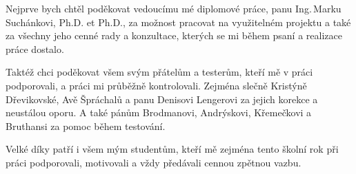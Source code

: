 \documentclass[czech,master,unicode]{ctufit-thesis}
\begin{document}
 
\frontmatter\frontmatterinit %
\thispagestyle{empty}\maketitle\thispagestyle{empty}\cleardoublepage %


\imprintpage %
\stopTOCentries

\begin{acknowledgmentpage}
    Nejprve bych chtěl poděkovat vedoucímu mé diplomové práce, panu Ing.\,Marku Suchánkovi, Ph.D. et Ph.D., za možnost pracovat na využitelném projektu a také za všechny jeho cenné rady a konzultace, kterých se mi během psaní a realizace práce dostalo.

    \vspace{1em}
    
    Taktéž chci poděkovat všem svým přátelům a testerům, kteří mě v práci podporovali, a práci mi průběžně kontrolovali. Zejména slečně Kristýně Dřevikovské, Avě Špráchalů a panu Denisovi Lengerovi za jejich korekce a neustálou oporu. A také pánům
    Brodmanovi,
    Andrýskovi,
    Křemečkovi
    a
    Bruthansi 
    za pomoc během testování.

    \vspace{1em}

    Velké díky patří i všem mým studentům, kteří mě zejména tento školní rok při práci podporovali, motivovali a vždy předávali cennou zpětnou vazbu. 
\end{acknowledgmentpage} 
\end{document}
